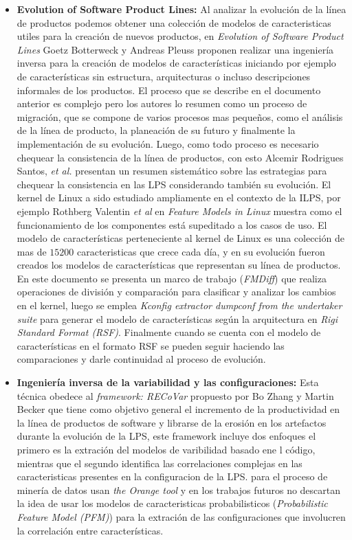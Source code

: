 \begin{itemize}
	\item{ \textbf{Evolution of Software Product Lines:}}
	Al analizar la evolución de la línea de productos podemos obtener una colección de modelos de caracteristicas utiles para la creación de nuevos productos, en \textit{Evolution of Software Product Lines}\cite{PeterJ.Olver2013}  Goetz Botterweck y Andreas Pleuss proponen realizar una ingeniería inversa para la creación de modelos de características iniciando por ejemplo de características sin estructura, arquitecturas o incluso descripciones informales de los productos.  El proceso que se describe en el documento anterior es complejo pero los autores lo resumen como un proceso de migración, que se compone de varios procesos mas pequeños, como el análisis de la línea de producto, la planeación de su futuro y finalmente la implementación de su evolución. Luego, como todo proceso es necesario chequear la consistencia de la línea de productos, con esto Alcemir Rodrigues Santos, \textit{et al.} presentan un resumen sistemático sobre las estrategias para chequear la consistencia en las LPS\cite{Santos2015} considerando también su evolución.
	El kernel de Linux a sido estudiado ampliamente en el contexto de la ILPS, por ejemplo Rothberg Valentin \textit{et al} en \textit{Feature Models in Linux}\cite{Rothberg2016} muestra como el funcionamiento de los componentes está supeditado a los casos de uso.  El modelo de características perteneciente al kernel de Linux es una colección de mas de $15200$ caracteristicas que crece cada día, y en su evolución fueron creados los modelos de características que representan su línea de productos. En este documento se presenta un marco de trabajo (\textit{FMDiff}) que realiza operaciones de división y comparación para clasificar y analizar los cambios en el kernel, luego se emplea \textit{Kconfig extractor dumpconf from the undertaker suite} para generar el modelo de características según la arquitectura en \textit{Rigi Standard Format (RSF)}. Finalmente cuando se cuenta con el modelo de características en el formato RSF se pueden seguir haciendo las comparaciones y darle continuidad al proceso de evolución.
	\item{ \textbf{Ingeniería inversa de la variabilidad y las configuraciones:}}
	Esta técnica obedece al \textit{framework: RECoVar}\cite{Zhang2013} propuesto por Bo Zhang y Martin Becker  que tiene como objetivo general el incremento de la productividad en la línea de productos de software y librarse de la erosión en los artefactos durante la evolución de la LPS, este framework incluye dos enfoques el primero es la extración del modelos de varibilidad basado ene l código, mientras que el segundo identifica las correlaciones complejas en las caracteristicas presentes en la configuracion de la LPS. para el proceso de minería de datos usan \textit{the Orange tool} y en los trabajos futuros no descartan la idea de usar los modelos de caracteristicas probabilisticos (\textit{Probabilistic Feature Model (PFM)}) para la extración de las configuraciones que involucren la correlación entre características.

\end{itemize}
